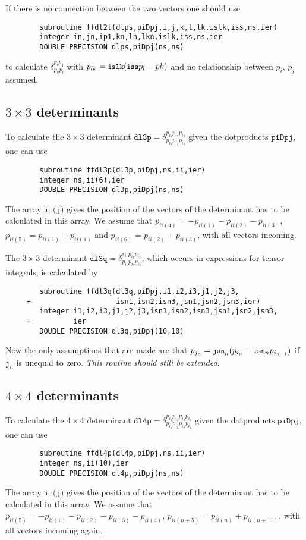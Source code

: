 \documentclass[twoside,12pt]{report}
\def\Code#1{\ensuremath{\texttt{#1}}}
\begin{document}
\begin{appendix}
If there is no connection between the two vectors one should use
\begin{verbatim}
        subroutine ffdl2t(dlps,piDpj,i,j,k,l,lk,islk,iss,ns,ier)
        integer in,jn,ip1,kn,ln,lkn,islk,iss,ns,ier
        DOUBLE PRECISION dlps,piDpj(ns,ns)
\end{verbatim}
to calculate $\delta^{p_i p_j}_{p_k p_l}$ with $p_{lk} = \mbox{\small\tt islk}
( \mbox{\small\tt iss} p_l - pk)$ and no relationship between $p_i$, $p_j$ 
assumed.

\subsection{$3\times3$ determinants}

To calculate the $3\times3$ determinant $\Code{dl3p} = 
\delta^{p_{i_1}p_{i_2}p_{i_3}}_{p_{i_1}p_{i_2}p_{i_3}}$ given the dotproducts 
\Code{piDpj}, one can use
\begin{verbatim}
        subroutine ffdl3p(dl3p,piDpj,ns,ii,ier)
        integer ns,ii(6),ier
        DOUBLE PRECISION dl3p,piDpj(ns,ns)
\end{verbatim}
The array \Code{ii(j)} gives the position of the vectors of the determinant has 
to be calculated in this array.  We assume that $p_{ii(4)} = -p_{ii(1)} 
-p_{ii(2)} -p_{ii(3)}$, $p_{ii(5)} = p_{ii(1)} + p_{ii(1)}$ and 
$p_{ii(6)} = p_{ii(2)} + p_{ii(3)}$, with all vectors incoming.

The $3\times3$ determinant $\Code{dl3q} = \delta^{s_{i_1} p_{i_2} p_{i_3}
}_{p_{i_1}p_{i_2}p_{i_3}}$, which occurs in expressions for tensor integrals,
is calculated by
\begin{verbatim}
        subroutine ffdl3q(dl3q,piDpj,i1,i2,i3,j1,j2,j3,
     +                    isn1,isn2,isn3,jsn1,jsn2,jsn3,ier)
        integer i1,i2,i3,j1,j2,j3,isn1,isn2,isn3,jsn1,jsn2,jsn3,
     +          ier
        DOUBLE PRECISION dl3q,piDpj(10,10)
\end{verbatim}
Now the only assumptions that are made are that $p_{j_n} = \mbox{\small\tt 
jsn}_n (p_{i_n} - \mbox{\small\tt isn}_n p_{i_{n+1}})$ if $\Code{j}_n$ is 
unequal to zero.  {\em This routine should still be extended}.

\subsection{$4\times4$ determinants}

To calculate the $4\times4$ determinant $\Code{dl4p} = 
\delta^{p_{i_1}p_{i_2}p_{i_3}p_{i_4}}_{p_{i_1}p_{i_2}p_{i_3}p_{i_4}}$ given 
the dotproducts \Code{piDpj}, one can use
\begin{verbatim}
        subroutine ffdl4p(dl4p,piDpj,ns,ii,ier)
        integer ns,ii(10),ier
        DOUBLE PRECISION dl4p,piDpj(ns,ns)
\end{verbatim}
The array \Code{ii(j)} gives the position of the vectors of the determinant has 
to be calculated in this array.  We assume that $p_{ii(5)} = -p_{ii(1)} 
-p_{ii(2)} -p_{ii(3)} -p_{ii(4)}$, $p_{ii(n+5)} = p_{ii(n)} + p_{ii(n+11)}$, 
with all vectors incoming again.

\end{appendix}
\end{document}
